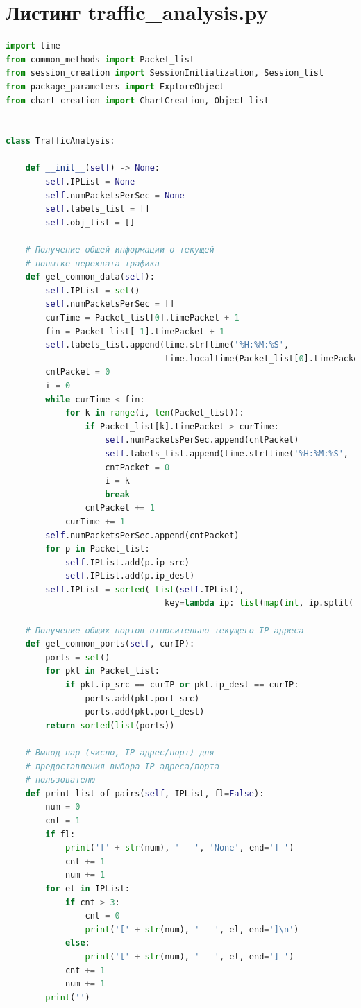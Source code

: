 \documentclass[spec, och, diploma]{SCWorks}
\begin{document}
    \section{Листинг traffic\_analysis.py}

    \begin{lstlisting}[language=Python]
import time
from common_methods import Packet_list
from session_creation import SessionInitialization, Session_list
from package_parameters import ExploreObject
from chart_creation import ChartCreation, Object_list


class TrafficAnalysis:

    def __init__(self) -> None:
        self.IPList = None
        self.numPacketsPerSec = None
        self.labels_list = []
        self.obj_list = []

    # Получение общей информации о текущей
    # попытке перехвата трафика
    def get_common_data(self):
        self.IPList = set()
        self.numPacketsPerSec = []
        curTime = Packet_list[0].timePacket + 1
        fin = Packet_list[-1].timePacket + 1
        self.labels_list.append(time.strftime('%H:%M:%S', 
                                time.localtime(Packet_list[0].timePacket)))
        cntPacket = 0
        i = 0
        while curTime < fin:
            for k in range(i, len(Packet_list)):
                if Packet_list[k].timePacket > curTime:
                    self.numPacketsPerSec.append(cntPacket)
                    self.labels_list.append(time.strftime('%H:%M:%S', time.localtime(curTime)))
                    cntPacket = 0
                    i = k
                    break
                cntPacket += 1
            curTime += 1
        self.numPacketsPerSec.append(cntPacket)
        for p in Packet_list:
            self.IPList.add(p.ip_src)
            self.IPList.add(p.ip_dest)
        self.IPList = sorted( list(self.IPList), 
                                key=lambda ip: list(map(int, ip.split('.'))) )
    
    # Получение общих портов относительно текущего IP-адреса
    def get_common_ports(self, curIP):
        ports = set()
        for pkt in Packet_list:
            if pkt.ip_src == curIP or pkt.ip_dest == curIP:
                ports.add(pkt.port_src)
                ports.add(pkt.port_dest)
        return sorted(list(ports))

    # Вывод пар (число, IP-адрес/порт) для
    # предоставления выбора IP-адреса/порта
    # пользователю
    def print_list_of_pairs(self, IPList, fl=False):
        num = 0
        cnt = 1
        if fl:
            print('[' + str(num), '---', 'None', end='] ')
            cnt += 1
            num += 1
        for el in IPList:
            if cnt > 3:
                cnt = 0
                print('[' + str(num), '---', el, end=']\n')
            else:
                print('[' + str(num), '---', el, end='] ')
            cnt += 1
            num += 1
        print('')


\end{lstlisting}
\end{document}
